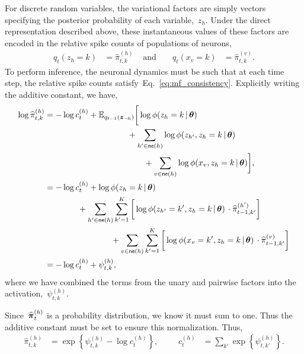 For discrete random variables, the variational factors are simply
vectors specifying the posterior probability of each variable,~$z_h$.
Under the direct representation described above, these instantaneous
values of these factors are encoded in the relative spike counts of
populations of neurons,
\begin{align}
  q_t(z_h=k) &= \widehat{\pi}_{t,k}^{(h)} &\text{ and }& &
  q_t(x_v=k) &= \widehat{\pi}_{t,k}^{(v)}.
\end{align}
To perform inference, the neuronal dynamics must be such that at each
time step, the relative spike counts satisfy~Eq.~\ref{eq:mf_consistency}. 
Explicitly writing the additive constant, we have,
\begin{align}
  \nonumber
  \log \widehat{\pi}_{t,k}^{(h)} 
  &= -\log c_t^{(h)} + \bbE_{q_{t-1}(\bz_{\neg h})} 
    \bigg[\log \phi(z_h=k \given \btheta) \\
  &\nonumber \hspace{10em}+\sum_{h' \in \neigh(h)} \log \phi(z_{h'}, z_h=k \given \btheta)\\
  &\hspace{12em}+\sum_{v \in \neigh(h)} \log \phi(x_v, z_h=k \given \btheta) \bigg], \\
  & \nonumber = 
     - \log c_t^{(h)} + \log \phi(z_h=k \given \btheta) \\
  & \nonumber \hspace{4em} + \sum_{h' \in \neigh(h)} \sum_{k'=1}^K
  \bigg[\log \phi(z_{h'}=k', z_h=k \given \btheta) \,\cdot  \widehat{\pi}_{t-1,k'}^{(h')} \bigg] \\
  & \label{eq:variational_rate}
    \hspace{8em} + \sum_{v \in \neigh(h)} \sum_{k'=1}^K
    \bigg[\log \phi(x_v=k', z_h=k \given \btheta) \, \cdot \widehat{\pi}_{t-1,k'}^{(v)} \bigg] \\
    &=  -\log c_t^{(h)} + \psi_{t,k}^{(h)},
\end{align}
where we have combined the terms from the unary and pairwise factors
into the activation,~$\psi_{t,k}^{(h)}$.

Since~$\widehat{\boldsymbol{\pi}}_{t}^{(h)}$ is a probability distribution, we
know it must sum to one. Thus the additive constant must be set to
ensure this normalization.  Thus,
\begin{align}
  \widehat{\pi}_{t,k}^{(h)} &=
  \exp \left \{\psi_{t,k}^{(h)} -\log c_{t}^{(h)} \right \},
  & & &
  c_t^{(h)} &= \sum_{k'} \exp \left \{\psi_{t,k'}^{(h)} \right \}.
\end{align}

